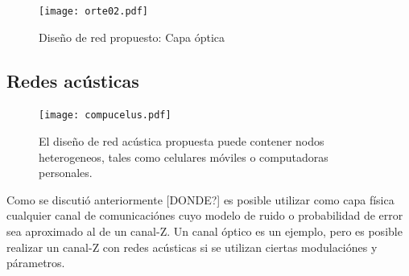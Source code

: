 \begin{figure}[!t]
  \centering
    \texttt{[image: orte02.pdf]}
    \caption{Diseño de red propuesto: Capa óptica}
    \label{arch:fig1}
\end{figure}

\subsection{Redes acústicas}
\begin{figure}[!t]
  \centering
    \texttt{[image: compucelus.pdf]}
    \caption{El diseño de red acústica propuesta puede contener nodos heterogeneos, tales como celulares móviles o computadoras personales.}
    \label{arch:chain}
\end{figure}

Como se discutió anteriormente [DONDE?] es posible utilizar como capa física cualquier canal de comunicaciónes cuyo modelo de ruido o probabilidad de error sea aproximado al de un canal-Z. Un canal óptico es un ejemplo, pero es posible realizar un canal-Z con redes acústicas si se utilizan ciertas modulaciónes y párametros.

